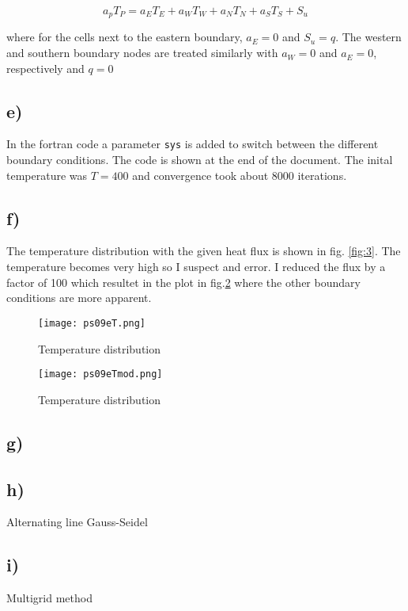 \documentclass{article}
\begin{document}
\begin{equation}
\label{eq:patankar}
a_p T_P = a_E T_E + a_W T_W + a_N T_N + a_S T_S + S_u
\end{equation}

where for the cells next to the eastern boundary, $a_E = 0$ and $S_u = q$. The western and southern boundary nodes are treated similarly with $a_W = 0$ and $a_E= 0$, respectively and $q=0$

\subsection{e)}
In the fortran code a parameter \texttt{sys} is added to switch between the different boundary conditions. The code is shown at the end of the document. The inital temperature was $T = 400$ and convergence took about 8000 iterations.

\subsection{f)}

 The temperature distribution with the given heat flux is shown in fig. \ref{fig:3}. The temperature becomes very high so I suspect and error. I reduced the flux by a factor of 100 which resultet in the plot in fig.\ref{fig:emod} where the other boundary conditions are more apparent.

\begin{figure}
\texttt{[image: ps09eT.png]}
\caption{Temperature distribution}
\label{fig:e}
\end{figure}

\begin{figure}
\texttt{[image: ps09eTmod.png]}
\caption{Temperature distribution}
\label{fig:emod}
\end{figure}

\subsection{g)}


\subsection{h)}

Alternating line Gauss-Seidel

\subsection{i)}

Multigrid method


\end{document}

